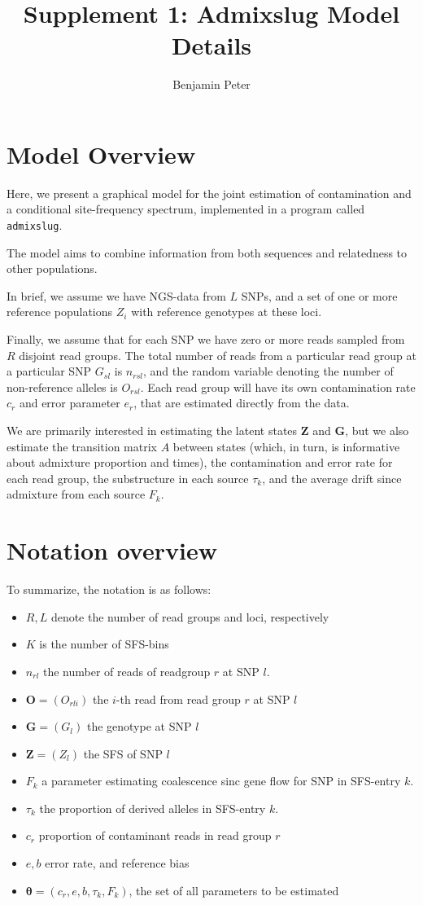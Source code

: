 \documentclass[10pt,a4paper]{article}
\author{Benjamin Peter}
\title{Supplement 1: Admixslug Model Details}
\newcommand{\BFZ}{\mathbf{Z}}
\newcommand{\BFG}{\mathbf{G}}
\newcommand{\BFO}{\mathbf{O}}
\begin{document}
	\maketitle
\section*{Model Overview}
	Here, we present a graphical model for the joint estimation of contamination and a conditional site-frequency spectrum, implemented in a program called \texttt{admixslug}.
	
	The model aims to combine information from both sequences and relatedness to other populations.
	
	In brief, we assume we have NGS-data from $L$ SNPs, and a set of one or more reference populations $Z_i$ with reference genotypes at these loci. 
	
	
	
	
	Finally, we assume that for each SNP we have zero or more reads sampled from $R$ disjoint read groups. The total number of reads from a particular read group at a particular SNP $G_{sl}$ is $n_{rsl}$, and the random variable denoting the number of non-reference alleles is $O_{rsl}$. Each read group will have its own contamination rate $c_r$ and error parameter $e_r$, that are estimated directly from the data.
	
	We are primarily interested in estimating the latent states $\BFZ$ and $\BFG$, but we also estimate the transition matrix $A$ between states (which, in turn, is informative about admixture proportion and times), the contamination and error rate for each read group, the substructure in each source $\tau_k$, and the average drift since admixture from each source $F_k$. 
\section*{Notation overview}
	To summarize, the notation is as follows: 
	\begin{itemize}
		\item $R, L$ denote the number of read groups and loci, respectively
		\item $K$ is the number of SFS-bins 
		\item $n_{rl}$ the number of reads of readgroup $r$ at SNP $l$.
		\item $\BFO = (O_{rli})$ the $i$-th read from read group $r$ at SNP $l$
		\item $\BFG = (G_{l})$ the genotype at SNP $l$
		\item $\BFZ = (Z_{l})$ the SFS of SNP $l$
		\item $F_k$ a parameter estimating coalescence sinc gene flow for SNP in SFS-entry $k$.
		\item $\tau_k$ the proportion of derived alleles in SFS-entry $k$.		
		\item $c_r$ proportion of contaminant reads in read group $r$
		\item $e,b$  error rate, and reference bias
		\item $\mathbf{\theta} = (c_r, e, b, \tau_k, F_k)$, the set of all parameters to be estimated
	\end{itemize}
\end{document}
